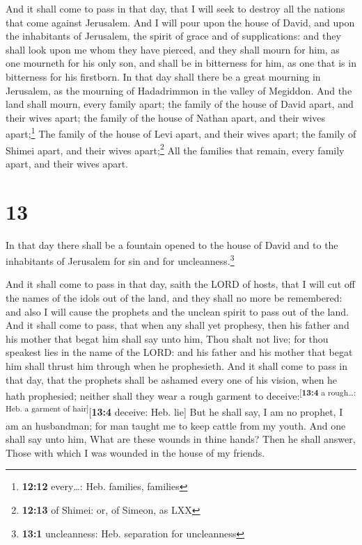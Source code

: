  And it shall come to pass in that day, that I will seek
to destroy all the nations that come against Jerusalem. 
And I will pour upon the house of David, and upon the inhabitants of
Jerusalem, the spirit of grace and of supplications: and they shall look
upon me whom they have pierced, and they shall mourn for him, as one
mourneth for his only son, and shall be in bitterness for him, as one
that is in bitterness for his firstborn.  In that day
shall there be a great mourning in Jerusalem, as the mourning of
Hadadrimmon in the valley of Megiddon.  And the land
shall mourn, every family apart; the family of the house of David apart,
and their wives apart; the family of the house of Nathan apart, and
their wives apart;\footnote{\textbf{12:12} every\ldots: Heb. families,
  families}  The family of the house of Levi apart, and
their wives apart; the family of Shimei apart, and their wives
apart;\footnote{\textbf{12:13} of Shimei: or, of Simeon, as LXX}
 All the families that remain, every family apart, and
their wives apart.

\hypertarget{section-12}{%
\section{13}\label{section-12}}

 In that day there shall be a fountain opened to the house
of David and to the inhabitants of Jerusalem for sin and for
uncleanness.\footnote{\textbf{13:1} uncleanness: Heb. separation for
  uncleanness}

 And it shall come to pass in that day, saith the LORD of
hosts, that I will cut off the names of the idols out of the land, and
they shall no more be remembered: and also I will cause the prophets and
the unclean spirit to pass out of the land.  And it shall
come to pass, that when any shall yet prophesy, then his father and his
mother that begat him shall say unto him, Thou shalt not live; for thou
speakest lies in the name of the LORD: and his father and his mother
that begat him shall thrust him through when he prophesieth.
 And it shall come to pass in that day, that the prophets
shall be ashamed every one of his vision, when he hath prophesied;
neither shall they wear a rough garment to
deceive:\textsuperscript{{[}\textbf{13:4} a rough\ldots: Heb. a garment
of hair{]}}{[}\textbf{13:4} deceive: Heb. lie{]}  But he
shall say, I am no prophet, I am an husbandman; for man taught me to
keep cattle from my youth.  And one shall say unto him,
What are these wounds in thine hands? Then he shall answer, Those with
which I was wounded in the house of my friends.

